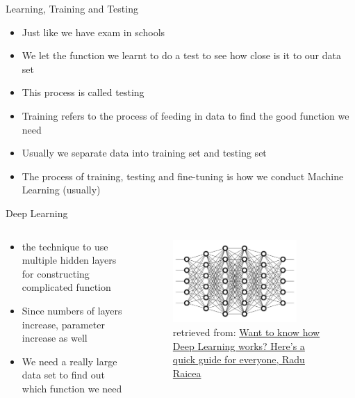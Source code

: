 \documentclass[10pt,xcolor={table,dvipsnames},t]{beamer}
\begin{document}
\begin{frame}{Learning, Training and Testing}
  \begin{itemize}
    \item Just like we have exam in schools
    \item We let the function we learnt to do a test to see how close is it to our data set
    \item This process is called testing
    \item Training refers to the process of feeding in data to find the good function we need
    \item Usually we separate data into training set and testing set
    \item The process of training, testing and fine-tuning is how we conduct Machine Learning (usually)
  \end{itemize}
\end{frame}

\begin{frame}{Deep Learning}
  \begin{columns}
    \begin{column}[T]{0.6\textwidth}
      \begin{itemize}
        \item the technique to use multiple hidden layers for constructing complicated function
        \item Since numbers of layers increase, parameter increase as well
        \item We need a really large data set to find out which function we need
      \end{itemize}
    \end{column}
    \begin{column}[T]{0.4\textwidth}
      \begin{figure}
        \includegraphics[width=0.8\textwidth]{img/DeepLearning.jpeg}
        \caption{retrieved from: \href{https://www.freecodecamp.org/news/want-to-know-how-deep-learning-works-heres-a-quick-guide-for-everyone-1aedeca88076/}{Want to know how Deep Learning works? Here’s a quick guide for everyone, Radu Raicea}}
      \end{figure}
    \end{column}
  \end{columns}
\end{frame}
\end{document}
